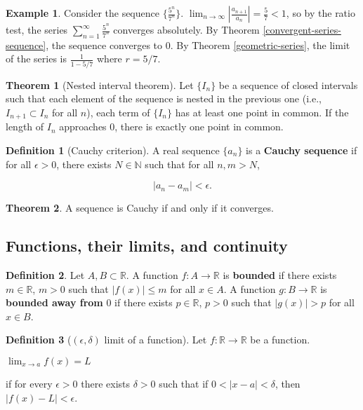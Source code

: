 \documentclass{article}
\theoremstyle{definition}
\newtheorem{definition}{Definition}[section]
\newtheorem{example}{Example}[section]
\newtheorem{theorem}{Theorem}[section]
\begin{document}
\begin{example}
Consider the sequence $\{\frac{5^n}{7^n}\}$. $\lim_{n \to \infty} |\frac{a_{n+1}}{a_n}| = \frac{5}{7} < 1$, so by the ratio test, the series $\sum\limits_{n=1}^\infty \frac{5^n}{7^n}$ converges absolutely. By Theorem \ref{convergent-series-sequence}, the sequence converges to 0. By Theorem \ref{geometric-series}, the limit of the series is $\frac{1}{1-5/7}$ where $r = 5/7$.
\end{example}

\begin{theorem}[Nested interval theorem]
Let $\{I_n\}$ be a sequence of closed intervals such that each element of the sequence is nested in the previous one (i.e., $I_{n+1} \subset I_n$ for all $n$), each term of $\{I_n\}$ has at least one point in common. If the length of $I_n$ approaches 0, there is exactly one point in common.
\end{theorem}

\begin{definition}[Cauchy criterion]
A real sequence $\{a_n\}$ is a \textbf{Cauchy sequence} if for all $\epsilon > 0$, there exists $N \in \mathbb{N}$ such that for all $n, m > N$, 

\begin{equation}
|a_n - a_m| < \epsilon.
\end{equation}
\end{definition}

\begin{theorem}
A sequence is Cauchy if and only if it converges.
\end{theorem}

\subsection{Functions, their limits, and continuity}

\begin{definition}
Let $A, B \subset \mathbb{R}$. A function $f: A \to \mathbb{R}$ is \textbf{bounded} if there exists $m \in \mathbb{R}$, $m > 0$ such that $|f(x)| \leq m$ for all $x \in A$. A function $g: B \to \mathbb{R}$ is \textbf{bounded away from} 0 if there exists $p \in \mathbb{R}$, $p > 0$ such that $|g(x)| > p$ for all $x \in B$. 
\end{definition}
\begin{definition}[$(\epsilon, \delta)$ limit of a function]

Let $f: \mathbb{R} \to \mathbb{R}$ be a function. 

\begin{center}
$\lim_{x \to a} f(x) = L$
\end{center}

if for every $\epsilon > 0$ there exists $\delta > 0$ such that if $0 < |x-a| <
\delta$, then $|f(x) - L| < \epsilon$.
 
\end{definition}
\end{document}
